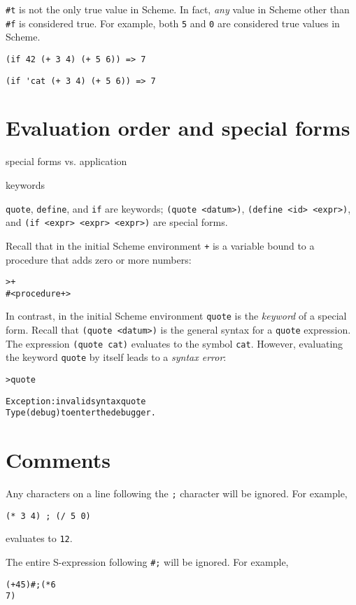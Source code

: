 \documentclass{book}
\begin{document}
\verb|#t| is not the only true value in Scheme.
In fact, \emph{any} value in Scheme other than \verb|#f| is considered true.
For example, both \verb|5| and \verb|0| are considered true values in Scheme.

\verb|(if 42 (+ 3 4) (+ 5 6)) => 7|

\verb|(if 'cat (+ 3 4) (+ 5 6)) => 7|

\section{Evaluation order and special forms}

special forms vs. application

keywords

\verb|quote|, \verb|define|, and \verb|if| are keywords; \verb|(quote <datum>)|, \verb|(define <id> <expr>)|, and \verb|(if <expr> <expr> <expr>)| are special forms.

Recall that in the initial Scheme environment \verb|+| is a variable bound to a procedure that adds zero or more numbers:

\begin{alltt}
> +
#<procedure +>
\end{alltt}

In contrast, in the initial Scheme environment \verb|quote| is the \emph{keyword} of a special form.  Recall that \verb|(quote <datum>)| is the general syntax for a \verb|quote| expression.  The expression \verb|(quote cat)| evaluates to the symbol \verb|cat|.  However, evaluating the keyword \verb|quote| by itself leads to a \emph{syntax error}:

\begin{alltt}
> quote

Exception: invalid syntax quote
Type (debug) to enter the debugger.
\end{alltt}


\section{Comments}

Any characters on a line following the \verb|;| character will be ignored.  For example,

\verb|(* 3 4) ; (/ 5 0)|

\noindent
evaluates to \verb|12|.

The entire S-expression following \verb|#;| will be ignored.  For example,

\begin{alltt}
(+ 4 5) #;(* 6
             7)
\end{alltt}
  
\end{document}
